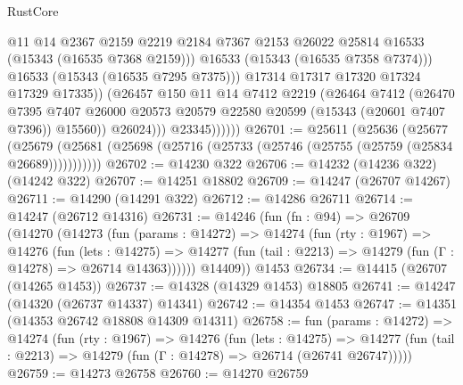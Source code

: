 \begin{lexlean}{RustCore}
\begin{coremodule}
                              @11
                              @14
                              @2367
                              @2159
                              @2219
                              @2184
                              @7367
                              @2153
                              @26022
                              @25814
                              @16533
                              (@15343 (@16535 @7368 @2159)))
                            @16533
                            (@15343 (@16535 @7358 @7374)))
                          @16533
                          (@15343 (@16535 @7295 @7375)))
                        @17314
                        @17317
                        @17320
                        @17324
                        @17329
                        @17335))
                    (@26457
                      @150
                      @11
                      @14
                      @7412
                      @2219
                      (@26464
                        @7412
                        (@26470
                          @7395
                          @7407
                          @26000
                          @20573
                          @20579
                          @22580
                          @20599
                          (@15343 (@20601 @7407 @7396))
                          @15560))
                      @26024)))
                @23345))))))
@26701 := @25611
    (@25636
      (@25677
        (@25679 (@25681 (@25698 (@25716 (@25733 (@25746 (@25755 (@25759 (@25834 @26689)))))))))))
@26702 := @14230 @322
@26706 := @14232 (@14236 @322) (@14242 @322)
@26707 := @14251 @18802
@26709 := @14247 (@26707 @14267)
@26711 := @14290 (@14291 @322)
@26712 := @14286 @26711
@26714 := @14247 (@26712 @14316)
@26731 := @14246
    (fun (fn : @94) =>
    @26709
      (@14270
        (@14273
          (fun (params : @14272) =>
          @14274
            (fun (rty : @1967) =>
            @14276
              (fun (lets : @14275) =>
              @14277 (fun (tail : @2213) => @14279 (fun (Γ : @14278) => @26714 @14363))))))
        @14409))
    @1453
@26734 := @14415 (@26707 (@14265 @1453))
@26737 := @14328 (@14329 @1453) @18805
@26741 := @14247 (@14320 (@26737 @14337) @14341)
@26742 := @14354 @1453
@26747 := @14351 (@14353 @26742 @18808 @14309 @14311)
@26758 := fun (params : @14272) =>
  @14274
    (fun (rty : @1967) =>
    @14276
      (fun (lets : @14275) =>
      @14277 (fun (tail : @2213) => @14279 (fun (Γ : @14278) => @26714 (@26741 @26747)))))
@26759 := @14273 @26758
@26760 := @14270 @26759

\end{coremodule}
\end{lexlean}
